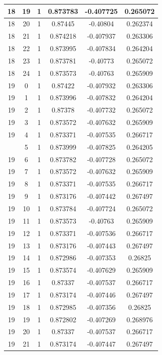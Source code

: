 \documentclass[12pt,a4paper]{article}
\numberwithin{equation}{section}
\numberwithin{figure}{section}
\numberwithin{table}{section}
\begin{document}
\begin{longtable}{|c|c|c|c|c|c|}
18 & 19 & 1 & 0.873783 & -0.407725 & 0.265072 \\ \hline
18 & 20 & 1 & 0.87445 & -0.40804 & 0.262374 \\ \hline
18 & 21 & 1 & 0.874218 & -0.407937 & 0.263306 \\ \hline
18 & 22 & 1 & 0.873995 & -0.407834 & 0.264204 \\ \hline
18 & 23 & 1 & 0.873781 & -0.40773 & 0.265072 \\ \hline
18 & 24 & 1 & 0.873573 & -0.40763 & 0.265909 \\ \hline
19 & 0 & 1 & 0.87422 & -0.407932 & 0.263306 \\ \hline
19 & 1 & 1 & 0.873996 & -0.407832 & 0.264204 \\ \hline
19 & 2 & 1 & 0.87378 & -0.407732 & 0.265072 \\ \hline
19 & 3 & 1 & 0.873572 & -0.407632 & 0.265909 \\ \hline
19 & 4 & 1 & 0.873371 & -0.407535 & 0.266717 \\ \hline
\pagebreak
19 & 5 & 1 & 0.873999 & -0.407825 & 0.264205 \\ \hline
19 & 6 & 1 & 0.873782 & -0.407728 & 0.265072 \\ \hline
19 & 7 & 1 & 0.873572 & -0.407632 & 0.265909 \\ \hline
19 & 8 & 1 & 0.873371 & -0.407535 & 0.266717 \\ \hline
19 & 9 & 1 & 0.873176 & -0.407442 & 0.267497 \\ \hline
19 & 10 & 1 & 0.873784 & -0.407724 & 0.265072 \\ \hline
19 & 11 & 1 & 0.873573 & -0.40763 & 0.265909 \\ \hline
19 & 12 & 1 & 0.873371 & -0.407536 & 0.266717 \\ \hline
19 & 13 & 1 & 0.873176 & -0.407443 & 0.267497 \\ \hline
19 & 14 & 1 & 0.872986 & -0.407353 & 0.26825 \\ \hline
19 & 15 & 1 & 0.873574 & -0.407629 & 0.265909 \\ \hline
19 & 16 & 1 & 0.87337 & -0.407537 & 0.266717 \\ \hline
19 & 17 & 1 & 0.873174 & -0.407446 & 0.267497 \\ \hline
19 & 18 & 1 & 0.872985 & -0.407356 & 0.26825 \\ \hline
19 & 19 & 1 & 0.872802 & -0.407269 & 0.268976 \\ \hline
19 & 20 & 1 & 0.87337 & -0.407537 & 0.266717 \\ \hline
19 & 21 & 1 & 0.873174 & -0.407447 & 0.267497 \\ \hline

\end{longtable}
\end{document}
